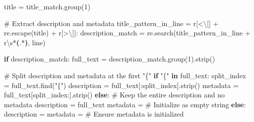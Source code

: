 \documentclass[
  11pt,
  letterpaper,
]{book}
\newenvironment{Shaded}{\begin{snugshade}}{\end{snugshade}}
\newcommand{\CharTok}[1]{\textcolor[rgb]{0.13,0.47,0.30}{#1}}
\newcommand{\CommentTok}[1]{\textcolor[rgb]{0.37,0.37,0.37}{#1}}
\newcommand{\ControlFlowTok}[1]{\textcolor[rgb]{0.00,0.23,0.31}{\textbf{#1}}}
\newcommand{\DecValTok}[1]{\textcolor[rgb]{0.68,0.00,0.00}{#1}}
\newcommand{\KeywordTok}[1]{\textcolor[rgb]{0.00,0.23,0.31}{\textbf{#1}}}
\newcommand{\NormalTok}[1]{\textcolor[rgb]{0.00,0.23,0.31}{#1}}
\newcommand{\OperatorTok}[1]{\textcolor[rgb]{0.37,0.37,0.37}{#1}}
\newcommand{\PreprocessorTok}[1]{\textcolor[rgb]{0.68,0.00,0.00}{#1}}
\newcommand{\StringTok}[1]{\textcolor[rgb]{0.13,0.47,0.30}{#1}}
\newcommand{\VerbatimStringTok}[1]{\textcolor[rgb]{0.13,0.47,0.30}{#1}}
\begin{document}
\begin{landscape}
\begin{Shaded}
\begin{Highlighting}[]
\NormalTok{        title }\OperatorTok{=}\NormalTok{ title\_match.group(}\DecValTok{1}\NormalTok{)}

        \CommentTok{\# Extract description and metadata}
\NormalTok{        title\_pattern\_in\_line }\OperatorTok{=} \VerbatimStringTok{r\textquotesingle{}}\PreprocessorTok{[\textless{}}\CharTok{\textbackslash{}[}\PreprocessorTok{]}\VerbatimStringTok{\textquotesingle{}} \OperatorTok{+}\NormalTok{ re.escape(title) }\OperatorTok{+} \VerbatimStringTok{r\textquotesingle{}}\PreprocessorTok{[\textgreater{}}\CharTok{\textbackslash{}]}\PreprocessorTok{]}\VerbatimStringTok{:\textquotesingle{}}
\NormalTok{        description\_match }\OperatorTok{=}\NormalTok{ re.search(title\_pattern\_in\_line }\OperatorTok{+} \VerbatimStringTok{r\textquotesingle{}}\DecValTok{\textbackslash{}s}\OperatorTok{*}\KeywordTok{(}\DecValTok{.}\OperatorTok{*}\KeywordTok{)}\VerbatimStringTok{\textquotesingle{}}\NormalTok{, line)}

        \ControlFlowTok{if}\NormalTok{ description\_match:}
\NormalTok{            full\_text }\OperatorTok{=}\NormalTok{ description\_match.group(}\DecValTok{1}\NormalTok{).strip()}

            \CommentTok{\# Split description and metadata at the first "\{"}
            \ControlFlowTok{if} \StringTok{"\{"} \KeywordTok{in}\NormalTok{ full\_text:}
\NormalTok{                split\_index }\OperatorTok{=}\NormalTok{ full\_text.find(}\StringTok{"\{"}\NormalTok{)}
\NormalTok{                description }\OperatorTok{=}\NormalTok{ full\_text[:split\_index].strip()}
\NormalTok{                metadata }\OperatorTok{=}\NormalTok{ full\_text[split\_index:].strip()}
            \ControlFlowTok{else}\NormalTok{:}
                \CommentTok{\# Keep the entire description and no metadata}
\NormalTok{                description }\OperatorTok{=}\NormalTok{ full\_text}
\NormalTok{                metadata }\OperatorTok{=} \StringTok{\textquotesingle{}\textquotesingle{}}  \CommentTok{\# Initialize as empty string}
        \ControlFlowTok{else}\NormalTok{:}
\NormalTok{            description }\OperatorTok{=} \StringTok{\textquotesingle{}\textquotesingle{}}
\NormalTok{            metadata }\OperatorTok{=} \StringTok{\textquotesingle{}\textquotesingle{}}  \CommentTok{\# Ensure metadata is initialized}


\end{Highlighting}
\end{Shaded}
\end{landscape}
\end{document}
